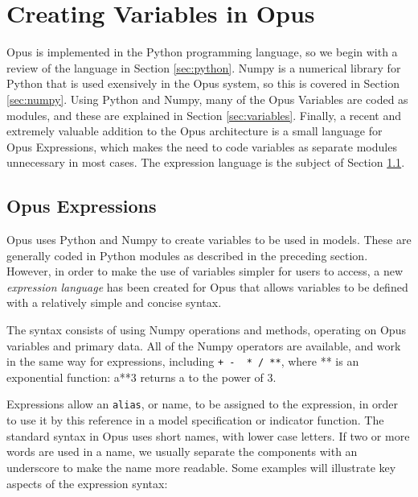 \chapter{Creating Variables in Opus}


Opus is implemented in the Python programming language, so we begin
with a review of the language in Section \ref{sec:python}. Numpy is a numerical library for Python that is used exensively in the
Opus system, so this is covered in Section \ref{sec:numpy}. Using
Python and Numpy, many of the Opus Variables are coded as modules, and
these are explained in Section \ref{sec:variables}.  Finally, a recent
and extremely valuable addition to the Opus architecture is a small
language for Opus Expressions, which makes the need to code variables
as separate modules unnecessary in most cases.  The expression language
is the subject of Section \ref{sec:expressions}.



\section{Opus Expressions}
\label{sec:expressions}

Opus uses Python and Numpy to create variables to be used in models.  These are generally coded in Python modules as
described in the preceding section.  However, in order to make the use of variables simpler for users to access, a new
\emph{expression language} has been created for Opus
that allows variables to be defined with a relatively simple and concise syntax.  

The syntax consists of using Numpy operations and methods, operating on Opus variables and primary data.  All of the Numpy operators are available, and work in the same way for expressions, including \verb#+ -  * / **#, where ** is an exponential function: a**3 returns a to the power of 3.

Expressions allow an \verb#alias#, or name, to be assigned to the expression, in order to use it by this reference in a model specification or indicator function.  The standard syntax in Opus uses short names, with lower case letters.  If two or more words are used in a name, we usually separate the components with an underscore to make the name more readable.  Some examples will illustrate key aspects of the expression syntax:

